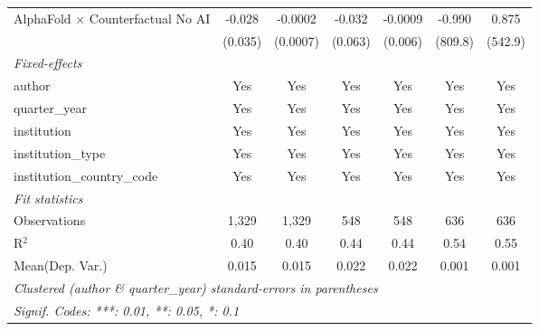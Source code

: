 \begin{tabular}{lcccccc}
   AlphaFold $\times$ Counterfactual No AI  & -0.028  & -0.0002  & -0.032  & -0.0009       & -0.990  & 0.875\\   
                                            & (0.035) & (0.0007) & (0.063) & (0.006)       & (809.8) & (542.9)\\   
   \midrule
   \emph{Fixed-effects}\\
   author                                   & Yes     & Yes      & Yes     & Yes           & Yes     & Yes\\  
   quarter\_year                            & Yes     & Yes      & Yes     & Yes           & Yes     & Yes\\  
   institution                              & Yes     & Yes      & Yes     & Yes           & Yes     & Yes\\  
   institution\_type                        & Yes     & Yes      & Yes     & Yes           & Yes     & Yes\\  
   institution\_country\_code               & Yes     & Yes      & Yes     & Yes           & Yes     & Yes\\  
   \midrule
   \emph{Fit statistics}\\
   Observations                             & 1,329   & 1,329    & 548     & 548           & 636     & 636\\  
   R$^2$                                    & 0.40    & 0.40     & 0.44    & 0.44          & 0.54    & 0.55\\  
Mean(Dep. Var.) & 0.015 & 0.015 & 0.022 & 0.022 & 0.001 & 0.001 \\
   \midrule \midrule
   \multicolumn{7}{l}{\emph{Clustered (author \& quarter\_year) standard-errors in parentheses}}\\
   \multicolumn{7}{l}{\emph{Signif. Codes: ***: 0.01, **: 0.05, *: 0.1}}\\
\end{tabular}
\par\endgroup

